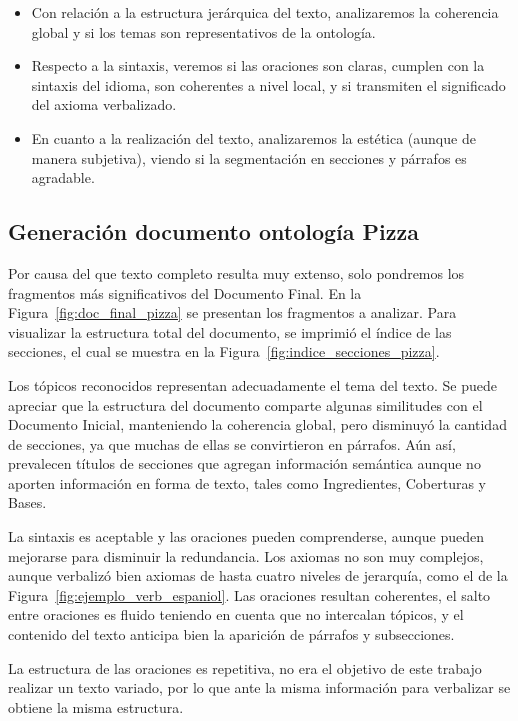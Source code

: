 \begin{itemize}
    \item Con relación a la estructura jerárquica del texto, analizaremos la coherencia global y si los temas son representativos de la ontología.
    \item Respecto a la sintaxis, veremos si las oraciones son claras, cumplen con la sintaxis del idioma, son coherentes a nivel local, y si transmiten el significado del axioma verbalizado. 
    \item En cuanto a la realización del texto, analizaremos la estética (aunque de manera subjetiva), viendo si la segmentación en secciones y párrafos es agradable.
\end{itemize}


\subsection{Generación documento ontología Pizza}
Por causa del que texto completo resulta muy extenso, solo pondremos los fragmentos más significativos del Documento Final. En la Figura~\ref{fig:doc_final_pizza} se presentan los fragmentos a analizar. Para visualizar la estructura total del documento, se imprimió el índice de las secciones, el cual se muestra en la Figura~\ref{fig:indice_secciones_pizza}. 

Los tópicos reconocidos representan adecuadamente el tema del texto. Se puede apreciar que la estructura del documento comparte algunas similitudes con el Documento Inicial, manteniendo la coherencia global, pero disminuyó la cantidad de secciones, ya que muchas de ellas se convirtieron en párrafos. Aún así, prevalecen títulos de secciones que agregan información semántica aunque no aporten información en forma de texto, tales como Ingredientes, Coberturas y Bases.

La sintaxis es aceptable y las oraciones pueden comprenderse, aunque pueden mejorarse para disminuir la redundancia. Los axiomas no son muy complejos, aunque verbalizó bien axiomas de hasta cuatro niveles de jerarquía, como el de la Figura~\ref{fig:ejemplo_verb_espaniol}. Las oraciones resultan coherentes, el salto entre oraciones es fluido teniendo en cuenta que no intercalan tópicos, y el contenido del texto anticipa bien la aparición de párrafos y subsecciones.

La estructura de las oraciones es repetitiva, no era el objetivo de este trabajo realizar un texto variado, por lo que ante la misma información para verbalizar se obtiene la misma estructura.

